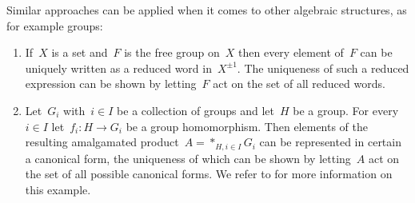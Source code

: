 \begin{example}
  Similar approaches can be applied when it comes to other algebraic structures, as for example groups:
  \begin{enumerate}
    \item
      If~$X$ is a set and~$F$ is the free group on~$X$ then every element of~$F$ can be uniquely written as a reduced word in~$X^{\pm 1}$.
      The uniqueness of such a reduced expression can be shown by letting~$F$ act on the set of all reduced words.
    \item
      Let~$G_i$ with~$i \in I$ be a collection of groups and let~$H$ be a group.
      For every~$i \in I$ let~$f_i \colon H \to G_i$ be a group homomorphism.
      Then elements of the resulting amalgamated product~$A = \ast_{H,i \in I} G_i$ can be represented in certain a canonical form, the uniqueness of which can be shown by letting~$A$ act on the set of all possible canonical forms.
      We refer to \cite[\S 1.2]{trees} for more information on this example.
  \end{enumerate}
\end{example}


